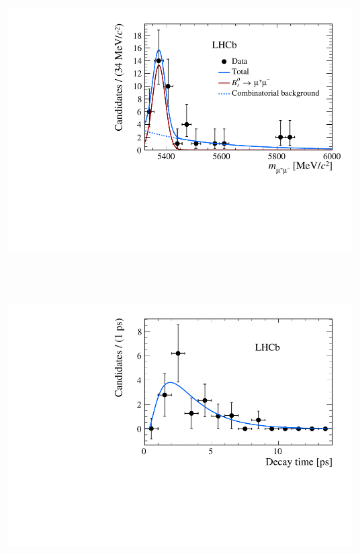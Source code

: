 {\begin{figure}[htbp]
    \centering
   \begin{subfigure}[b]{0.48\textwidth}
        \includegraphics[width= \textwidth]{./Figs/LifetimeMeasurement/lifetime_mass_results.pdf}
    \end{subfigure}
   ~ %
    \begin{subfigure}[b]{0.48\textwidth}
       \includegraphics[width=\textwidth]{./Figs/LifetimeMeasurement/lifetime_results.pdf}

\end{subfigure}
\end{figure}}
